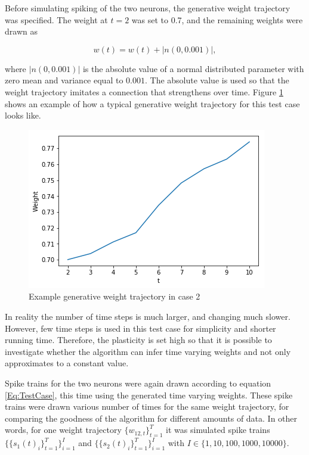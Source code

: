 Before simulating spiking of the two neurons, the generative weight trajectory was specified. The weight at $t=2$ was set to 0.7, and the remaining weights were drawn as

\begin{equation}
    w(t) = w(t) + |n(0,0.001)|,
\end{equation}

where $|n(0,0.001)|$ is the absolute value of a normal distributed parameter with zero mean and variance equal to $0.001$. The absolute value is used so that the weight trajectory imitates a connection that strengthens over time. Figure \ref{fig:Generative} shows an example of how a typical generative weight trajectory for this test case looks like. 

\begin{figure}
\caption{Example generative weight trajectory in case 2}
\label{fig:Generative}
    \centering
    \includegraphics[scale=0.8]{fig/UL.png}
\end{figure}


In reality the number of time steps is much larger, and changing much slower. However, few time steps is used in this test case for simplicity and shorter running time. Therefore, the plasticity is set high so that it is possible to investigate whether the algorithm can infer time varying weights and not only approximates to a constant value. 

Spike trains for the two neurons were again drawn according to equation \ref{Eq:TestCase}, this time using the generated time varying weights. These spike trains were drawn various number of times for the same weight trajectory, for comparing the goodness of the algorithm for different amounts of data. In other words, for one weight trajectory $\{w_{12,t}\}_{t=1}^T$ it was simulated spike trains
$\{\{s_{1}(t)_i\}_{t=1}^T\}_{i=1}^I$ and $\{\{s_{2}(t)_i\}_{t=1}^T\}_{i=1}^I$ with $I \in \{1,10,100,1000,10000 \}$.

